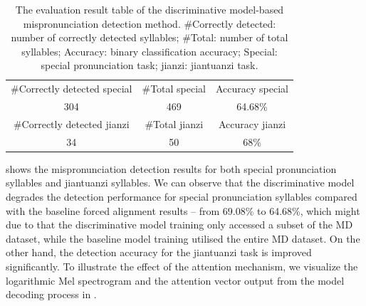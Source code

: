 \begin{table}[ht!]
\centering
\caption{The evaluation result table of the discriminative model-based mispronunciation detection method. \#Correctly detected: number of correctly detected syllables; \#Total: number of total syllables; Accuracy: binary classification accuracy; Special: special pronunciation task; jianzi: jiantuanzi task.}
\label{tab:ch6:results_discriminative_eval}
\begin{tabular}{ccc}
\toprule
\#Correctly detected special & \#Total special & Accuracy special \\
304 & 469 & 64.68\% \\
\midrule
\#Correctly detected jianzi & \#Total jianzi & Accuracy jianzi \\
34 & 50 & 68\% \\
\bottomrule
\end{tabular}
\end{table}

 shows the mispronunciation detection results for both special pronunciation syllables and \gls{jiantuanzi} syllables. We can observe that the discriminative model degrades the detection performance for special pronunciation syllables compared with the baseline forced alignment results -- from 69.08\% to 64.68\%, which might due to that the discriminative model training only accessed a subset of the MD dataset, while the baseline model training utilised the entire \gls{MD} dataset. On the other hand, the detection accuracy for the \gls{jiantuanzi} task is improved significantly. To illustrate the effect of the attention mechanism, we visualize the logarithmic Mel spectrogram and the attention vector output from the model decoding process in .

